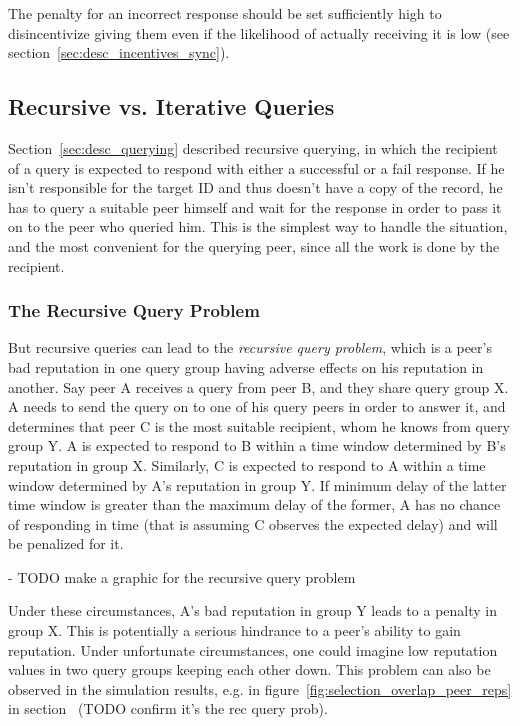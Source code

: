 The penalty for an incorrect response should be set sufficiently high to
disincentivize giving them even if the likelihood of actually receiving it is
low (see section~\ref{sec:desc_incentives_sync}).

\subsection{Recursive vs. Iterative Queries}
\label{sec:desc_recursive_vs_iterative}
Section~\ref{sec:desc_querying} described recursive querying, in which the
recipient of a query is expected to respond with either a successful or a fail
response. If he isn't responsible for the target ID and thus doesn't have a copy
of the record, he has to query a suitable peer himself and wait for the response
in order to pass it on to the peer who queried him. This is the simplest way to
handle the situation, and the most convenient for the querying peer, since all
the work is done by the recipient.

\subsubsection{The Recursive Query Problem}
\label{sec:desc_rec_query_prob}
But recursive queries can lead to the \emph{recursive query problem}, which is a
peer's bad reputation in one query group having adverse effects on his
reputation in another. Say peer A receives a query from peer B, and they share
query group X. A needs to send the query on to one of his query peers in order
to answer it, and determines that peer C is the most suitable recipient, whom he
knows from query group Y. A is expected to respond to B within a time window
determined by B's reputation in group X. Similarly, C is expected to respond to
A within a time window determined by A's reputation in group Y. If minimum delay
of the latter time window is greater than the maximum delay of the former, A has
no chance of responding in time (that is assuming C observes the expected
delay) and will be penalized for it.

- TODO make a graphic for the recursive query problem

Under these circumstances, A's bad reputation in group Y leads to a penalty in
group X. This is potentially a serious hindrance to a peer's ability to gain
reputation. Under unfortunate circumstances, one could imagine low reputation
values in two query groups keeping each other down. This problem can also be
observed in the simulation results, e.g. in
figure~\ref{fig:selection_overlap_peer_reps} in
section~\label{sec:rep_avail_selection_overlap} (TODO confirm it's the rec query
prob).

